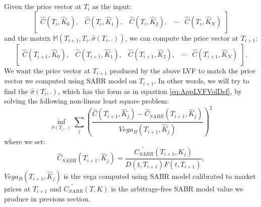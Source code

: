 \documentclass[letterpaper,12pt,titlepage,oneside,final]{book}
\numberwithin{equation}{section}
\theoremstyle{definition}
\begin{document}
 Given the price vector at $T_{i}$ as the input:
 \[\begin{bmatrix}
	 \widehat{C}(T_{i},\widehat{K}_0),&
	 \widehat{C}(T_{i},\widehat{K}_1),&
	 \widehat{C}(T_{i},\widehat{K}_2),&
	 \cdots&
	 \widehat{C}(T_{i},\widehat{K}_{N})
 \end{bmatrix}\] and the matrix $\mathcal{\mathbb{M}}(T_{i+1},T_{i}, \widehat{\sigma}(T_i,.))$, we can compute  the price vector at $T_{i+1}$:
 \[
 \begin{bmatrix}
	 \widehat{C}(T_{i+1},\widehat{K}_0),&
	 \widehat{C}(T_{i+1},\widehat{K}_1),&
	 \widehat{C}(T_{i+1},\widehat{K}_2),&
	 \cdots&
	 \widehat{C}(T_{i+1},\widehat{K}_{N})
	 \end{bmatrix}.
 \]
 We want  the price vector at $T_{i+1}$ produced by the above LVF to match the price vector we computed using SABR model on $T_{i+1}$. In other words, we will try to find the $\widehat{\sigma}(T_i,.)$, which has the form as in equation \eqref{eq:AppLVFVolDef}, by solving the following non-linear least square problem:
 \begin{equation}
 \inf_{\widehat{\sigma}(T_i,.)} \sum_{j}(\frac{\widehat{C}(T_{i+1},\widehat{K}_j)-\widehat{C}_{SABR}(T_{i+1},\widehat{K}_j)}{Vega_{B}(T_{i+1},\widehat{K}_j)})^2
 \label{eq:AppLVFCal}
  \end{equation}
 where we set: 
  \[
	 \widehat{C}_{SABR}(T_{i+1},\widehat{K}_j)=\frac{\widetilde {C_{SABR}}(T_{i+1},K_j)}{D(t,T_{i+1})F(t,T_{i+1})},
 \] $Vega_{B}(T_{i+1},\widehat{K}_j)$ is the vega computed using SABR model calibrated to market prices at $T_{i+1}$ and $\widetilde {C_{SABR}}(T,K)$ is the arbitrage-free SABR model value we produce in previous section.
 
\end{document}
